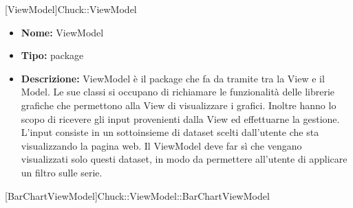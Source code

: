 
			[ViewModel]{Chuck::ViewModel}
			

	

			\begin{itemize}
			\item \textbf{Nome:} ViewModel
			\item \textbf{Tipo:} package
			
			\item \textbf{Descrizione:} ViewModel è il package che fa da tramite tra la View e il Model. Le sue classi si occupano di richiamare le funzionalità delle librerie grafiche che permettono alla View di visualizzare i grafici. Inoltre hanno lo scopo di ricevere gli input provenienti dalla View ed effettuarne la gestione. L’input consiste in un sottoinsieme di dataset scelti dall’utente che sta visualizzando la pagina web. Il ViewModel deve far sì che vengano visualizzati solo questi dataset, in modo da permettere all’utente di applicare un filtro sulle serie.
			\end{itemize}

			
			[BarChartViewModel]{Chuck::ViewModel::BarChartViewModel}
			

	
